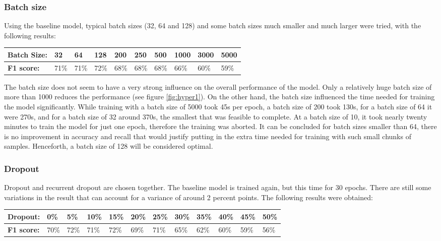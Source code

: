 \documentclass[
a4paper,
pagesize,
pdftex,
12pt,
ngerman,
fleqn,
final,
]{scrartcl}
\begin{document}
	\subsubsection{Batch size}
	Using the baseline model, typical batch sizes (32, 64 and 128) and some batch sizes much smaller and much larger were tried, with the following results: 
	
	\begin{tabular} { | p{3cm} || p{0.8cm} | p{0.8cm}  | p{0.8cm}  |p{0.8cm} | p{0.8cm} | p{0.8cm} | p{0.8cm} | p{0.8cm}| p{0.8cm} |}
		\hline
		\textbf{Batch Size:}  &  32 & 64 & 128 & 200 & 250 & 500 & 1000 & 3000 &5000\\   
		\hline
		\textbf{F1 score:} & 71\% & 71\% & 72\% & 68\% & 68\% & 68\% & 66\% & 60\% & 59\%\\
		\hline
		\hline
	\end{tabular}
	
	The batch size does not seem to have a very strong influence on the overall performance of the model. Only a relatively huge batch size of more than 1000 reduces the performance (see figure \ref{fig:hyper1}). On the other hand, the batch size influenced the time needed for training the model significantly. While training with a batch size of 5000 took 45s per epoch, a batch size of 200 took 130s, for a batch size of 64 it were 270s, and for a batch size of 32 around 370s, the smallest that was feasible to complete. At a batch size of 10, it took nearly twenty minutes to train the model for just one epoch, therefore the training was aborted. It can be concluded for batch sizes smaller than 64, there is no improvement in accuracy and recall that would justify putting in the extra time needed for training with such small chunks of samples. Henceforth, a batch size of 128 will be considered optimal.

	\subsubsection{Dropout}
	Dropout and recurrent dropout are chosen together. The baseline model is trained again, but this time for 30 epochs. There are still some variations in the result that can account for a variance of around 2 percent points. The following results were obtained:
	
	\begin{tabular} { | p{2cm} || p{0.7cm} | p{0.7cm} | p{0.7cm} | p{0.7cm}  | p{0.7cm} | p{0.7cm} | p{0.7cm} | p{0.7cm} | p{0.7cm} | p{0.7cm} | p{0.7cm} |}
		\hline
		\textbf{Dropout:}  & 0\% & 5\% & 10\% & 15\%   & 20\% & 25\% & 30\% & 35\% & 40\% & 45\% & 50\% \\   
		\hline
		\textbf{F1 score:} & 70\% & 72\% & 71\% & 72\% & 69\% & 71\% & 65\% & 62\% & 60\% & 59\% & 56\% \\
		\hline
		\hline
	\end{tabular}
	
\end{document}
